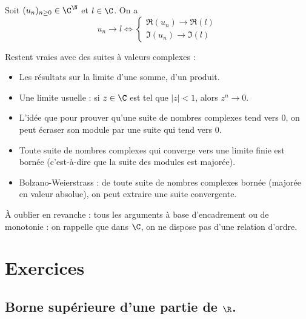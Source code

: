 \documentclass[11pt]{article}
\begin{document}
\begin{prop}{}{}
    Soit $(u_n)_{n\geq0}\in\C^\N$ et $l\in\C$. On a
    \begin{equation*}
        u_n \to l \iff \begin{cases}
            \Re(u_n) \to \Re(l)\\
            \Im(u_n) \to \Im(l)
        \end{cases}
    \end{equation*}
\end{prop}

Restent vraies avec des suites à valeurs complexes :

\begin{itemize}[label=---]
    \item Les résultats sur la limite d'une somme, d'un produit.
    \item Une limite usuelle : si $z\in\C$ est tel que $|z|<1$, alors $z^n\to0$.
    \item L'idée que pour prouver qu'une suite de nombres complexes tend vers 0, on peut écraser son module par une suite qui tend vers 0.
    \item Toute suite de nombres complexes qui converge vers une limite finie est bornée (c'est-à-dire que la suite des modules est majorée).
    \item Bolzano-Weierstrass : de toute suite de nombres complexes bornée (majorée en valeur absolue), on peut extraire une suite convergente.
\end{itemize}

À oublier en revanche : tous les arguments à base d'encadrement ou de monotonie : on rappelle que dans $\C$, on ne dispose pas d'une relation d'ordre.

\section{Exercices}

\subsection*{Borne supérieure d'une partie de $\R$.}
\end{document}
